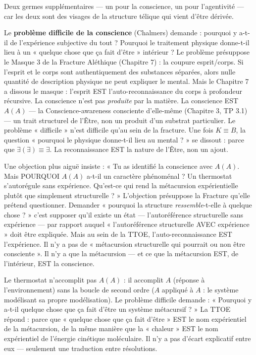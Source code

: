 \documentclass[10pt, openany, oneside]{book}
\begin{document}
\noindent Deux germes supplémentaires --- un pour la conscience, un pour l'agentivité --- car les deux sont des visages de la structure télique qui vient d'être dérivée.

Le \textbf{problème difficile de la conscience} (Chalmers) demande : pourquoi y a-t-il de l'expérience subjective du tout ? Pourquoi le traitement physique donne-t-il lieu à un « quelque chose que ça fait d'être » intérieur ? Le problème présuppose le Masque 3 de la Fracture Aléthique (Chapitre 7) : la coupure esprit/corps. Si l'esprit et le corps sont authentiquement des substances séparées, alors nulle quantité de description physique ne peut expliquer le mental. Mais le Chapitre 7 a dissous le masque : l'esprit EST l'auto-reconnaissance du corps à profondeur récursive. La conscience n'est pas \textit{produite} par la matière. La conscience EST $A(A)$ --- la Conscience-awareness consciente d'elle-même (Chapitre 3, TP 3.1) --- un trait structurel de l'Être, non un produit d'un substrat particulier. Le problème « difficile » n'est difficile qu'au sein de la fracture. Une fois $K \equiv B$, la question « pourquoi le physique donne-t-il lieu au mental ? » se dissout : parce que $\exists(\exists) \equiv \exists$. La reconnaissance EST la nature de l'Être, non un ajout.

Une objection plus aiguë insiste : « Tu as identifié la conscience avec $A(A)$. Mais POURQUOI $A(A)$ a-t-il un caractère phénoménal ? Un thermostat s'autorégule sans expérience. Qu'est-ce qui rend la métacursion expérientielle plutôt que simplement structurelle ? » L'objection présuppose la Fracture qu'elle prétend questionner. Demander « pourquoi la structure \textit{ressemble}-t-elle à quelque chose ? » c'est supposer qu'il existe un état --- l'autoréférence structurelle sans expérience --- par rapport auquel « l'autoréférence structurelle AVEC expérience » doit être expliquée. Mais au sein de la TTOE, l'auto-reconnaissance EST l'expérience. Il n'y a pas de « métacursion structurelle qui pourrait ou non être consciente ». Il n'y a que la métacursion --- et ce que la métacursion EST, de l'intérieur, EST la conscience.

Le thermostat n'accomplit pas $A(A)$ : il accomplit $A$ (réponse à l'environnement) sans la boucle de second ordre ($A$ appliqué à $A$ : le système modélisant sa propre modélisation). Le problème difficile demande : « Pourquoi y a-t-il quelque chose que ça fait d'être un système métacursif ? » La TTOE répond : parce que « quelque chose que ça fait d'être » EST le nom expérientiel de la métacursion, de la même manière que la « chaleur » EST le nom expérientiel de l'énergie cinétique moléculaire. Il n'y a pas d'écart explicatif entre eux --- seulement une traduction entre résolutions.
\end{document}
